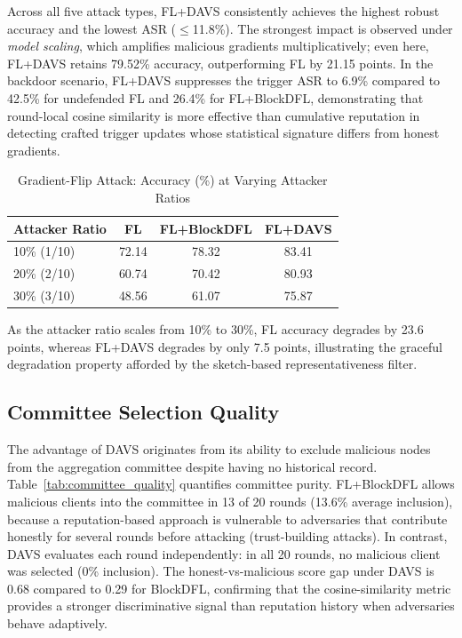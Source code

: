 \documentclass[conference]{IEEEtran}
\begin{document}
Across all five attack types, FL+DAVS consistently achieves the highest robust accuracy and the lowest ASR ($\leq$11.8\%). The strongest impact is observed under \textit{model scaling}, which amplifies malicious gradients multiplicatively; even here, FL+DAVS retains 79.52\% accuracy, outperforming FL by 21.15 points. In the backdoor scenario, FL+DAVS suppresses the trigger ASR to 6.9\% compared to 42.5\% for undefended FL and 26.4\% for FL+BlockDFL, demonstrating that round-local cosine similarity is more effective than cumulative reputation in detecting crafted trigger updates whose statistical signature differs from honest gradients.

\begin{table}[!t]
\centering
\caption{Gradient-Flip Attack: Accuracy (\%) at Varying Attacker Ratios}
\begin{tabular}{|l|c|c|c|}
\hline
Attacker Ratio & FL & FL+BlockDFL & FL+DAVS \\
\hline
10\% (1/10) & 72.14 & 78.32 & 83.41 \\
20\% (2/10) & 60.74 & 70.42 & 80.93 \\
30\% (3/10) & 48.56 & 61.07 & 75.87 \\
\hline
\end{tabular}
\label{tab:attack_scale}
\end{table}

As the attacker ratio scales from 10\% to 30\%, FL accuracy degrades by 23.6 points, whereas FL+DAVS degrades by only 7.5 points, illustrating the graceful degradation property afforded by the sketch-based representativeness filter.

\subsection{Committee Selection Quality}
The advantage of DAVS originates from its ability to exclude malicious nodes from the aggregation committee despite having no historical record. Table~\ref{tab:committee_quality} quantifies committee purity. FL+BlockDFL allows malicious clients into the committee in 13 of 20 rounds (13.6\% average inclusion), because a reputation-based approach is vulnerable to adversaries that contribute honestly for several rounds before attacking (trust-building attacks). In contrast, DAVS evaluates each round independently: in all 20 rounds, no malicious client was selected (0\% inclusion). The honest-vs-malicious score gap under DAVS is 0.68 compared to 0.29 for BlockDFL, confirming that the cosine-similarity metric provides a stronger discriminative signal than reputation history when adversaries behave adaptively.
\end{document}
